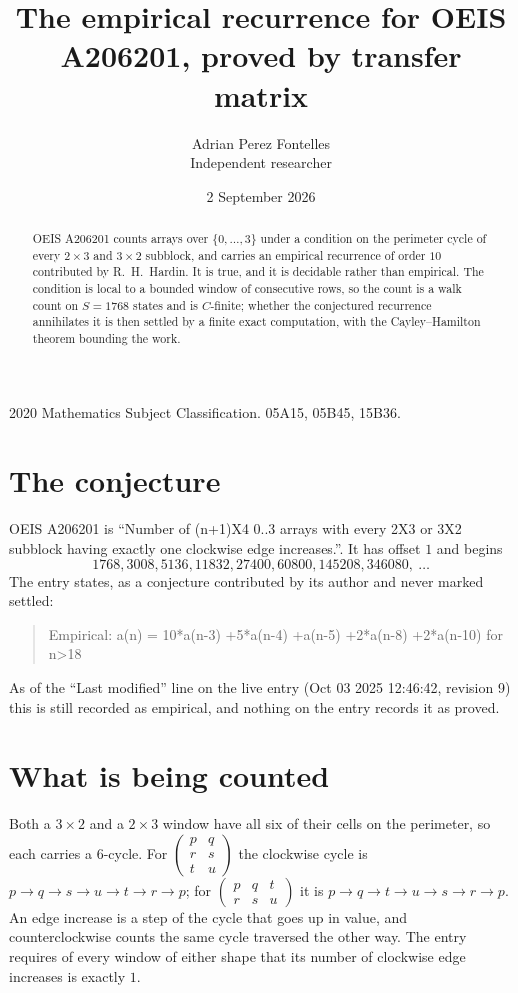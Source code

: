 \documentclass[11pt,a4paper]{article}
\title{The empirical recurrence for OEIS A206201, proved by transfer matrix}
\author{Adrian Perez Fontelles\\ \small Independent researcher}
\date{2 September 2026}
\theoremstyle{plain}
\theoremstyle{definition}
\begin{document}
\maketitle

\begin{abstract}
OEIS A206201 counts arrays over $\{0,\dots,3\}$ under a condition on the perimeter cycle of
every $2\times3$ and $3\times2$ subblock, and carries an empirical recurrence of order $10$ contributed by
R.~H.~Hardin. It is true, and it is decidable rather than empirical. The condition is local to
a bounded window of consecutive rows, so the count is a walk count on $S=1768$ states and is
$C$-finite; whether the conjectured recurrence annihilates it is then settled by a finite exact
computation, with the Cayley--Hamilton theorem bounding the work.
\end{abstract}

\noindent\small 2020 Mathematics Subject Classification. 05A15, 05B45, 15B36.\normalsize

\section{The conjecture}

OEIS A206201 is ``Number of (n+1)X4 0..3 arrays with every 2X3 or 3X2 subblock having exactly one clockwise edge increases.''. It has offset $1$ and begins
\[
1768, 3008, 5136, 11832, 27400, 60800, 145208, 346080,\ \dots
\]
The entry states, as a conjecture contributed by its author and never marked settled:
\begin{quote}
Empirical: a(n) = 10*a(n-3) +5*a(n-4) +a(n-5) +2*a(n-8) +2*a(n-10) for n>18
\end{quote}
As of the ``Last modified'' line on the live entry (Oct 03 2025 12:46:42, revision 9) this is still
recorded as empirical, and nothing on the entry records it as proved.

\section{What is being counted}

Both a $3\times2$ and a $2\times3$ window have all six of their cells on the
perimeter, so each carries a $6$-cycle. For
$\begin{pmatrix}p&q\\r&s\\t&u\end{pmatrix}$ the clockwise cycle is
$p\to q\to s\to u\to t\to r\to p$; for
$\begin{pmatrix}p&q&t\\r&s&u\end{pmatrix}$ it is
$p\to q\to t\to u\to s\to r\to p$. An edge increase is a step of the cycle that goes up in
value, and counterclockwise counts the same cycle traversed the other way. The entry requires
of every window of either shape that its number of clockwise edge increases is exactly $1$.
\end{document}
